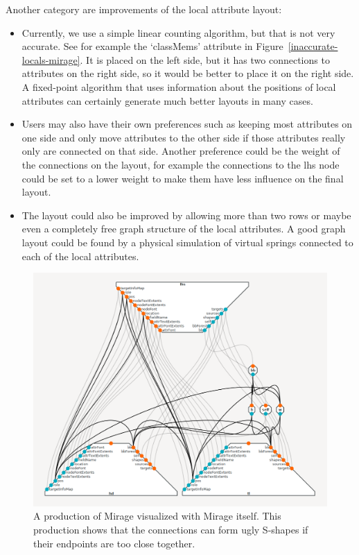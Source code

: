 \documentclass[11pt]{article}
\begin{document}
Another category are improvements of the local attribute layout:
\begin{itemize}
  \item Currently, we use a simple linear counting algorithm, but that is not very accurate. See for example the `classMems' attribute in Figure~\ref{inaccurate-locals-mirage}. It is placed on the left side, but it has two connections to attributes on the right side, so it would be better to place it on the right side. A fixed-point algorithm that uses information about the positions of local attributes can certainly generate much better layouts in many cases.
  \item Users may also have their own preferences such as keeping most attributes on one side and only move attributes to the other side if those attributes really only are connected on that side. Another preference could be the weight of the connections on the layout, for example the connections to the lhs node could be set to a lower weight to make them have less influence on the final layout. 
  \item The layout could also be improved by allowing more than two rows or maybe even a completely free graph structure of the local attributes. A good graph layout could be found by a physical simulation of virtual springs connected to each of the local attributes.
\end{itemize}

\begin{figure}[h]
  \centering
  \includegraphics[width=\linewidth]{s-shape-mirage}
  \caption{A production of Mirage visualized with Mirage itself. This production shows that the connections can form ugly S-shapes if their endpoints are too close together.}
  \label{s-shape-mirage}
\end{figure}
\end{document}
